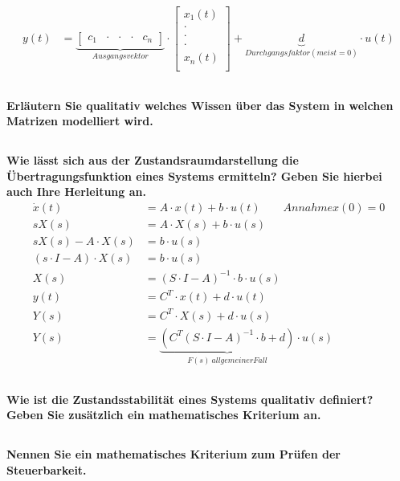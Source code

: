 \begin{equation}
\begin{aligned}
        y(t)    & =\underbrace{\left[\begin{array}{ccccc}
                    c_1 & \cdot & \cdot & \cdot & c_n
                \end{array}\right]}_{Ausgangsvektor}\cdot\left[
            \begin{array}{c}
                x_1(t) \\
                \cdot  \\
                \cdot  \\
                \cdot  \\
                x_n(t) \\
            \end{array}
            \right]+\underbrace{d}_{Durchgangsfaktor(meist=0)}\cdot u(t)
    \end{aligned}
\end{equation}

\subsection{}
\textbf{Erläutern Sie qualitativ welches Wissen über das System in welchen Matrizen modelliert wird.}

\subsection{}
\textbf{Wie lässt sich aus der Zustandsraumdarstellung die Übertragungsfunktion eines Systems ermitteln? Geben Sie hierbei auch Ihre Herleitung an.}
\begin{equation}
    \begin{aligned}
        \dot{x}(t)             & =A\cdot x(t)+b\cdot u(t)\qquad Annahme x(0)=0           \\
        sX(s)                  & =A\cdot X(s)+b\cdot u(s)                                \\
        sX(s)-A\cdot X(s)      & =b\cdot u(s)                                            \\
        (s\cdot I-A)\cdot X(s) & =b\cdot u(s)                                            \\
        X(s)                   & =(S\cdot I-A)^{-1}\cdot b\cdot u(s)                     \\
        y(t)                   & =C^T\cdot x(t)+d\cdot u(t)                              \\
        Y(s)                   & =C^T\cdot X(s)+d\cdot u(s)                              \\
        Y(s)                   & =\underbrace{(C^T(S\cdot I-A)^{-1}\cdot b+d)}_{F(s)\ allgemeiner Fall}\cdot u(s)
    \end{aligned}
\end{equation}
\subsection{}
\textbf{Wie ist die Zustandsstabilität eines Systems qualitativ definiert? Geben Sie zusätzlich ein mathematisches Kriterium an.}

\subsection{}
\textbf{Nennen Sie ein mathematisches Kriterium zum Prüfen der Steuerbarkeit.}
